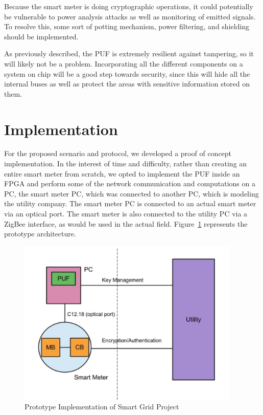 Because the smart meter is doing cryptographic operations, it could potentially be vulnerable to power analysis
attacks as well as monitoring of emitted signals. To resolve this, some sort of potting mechanism, power filtering,
and shielding should be implemented. 

As previously described, the PUF is extremely resilient against tampering, so it will likely not be a problem.
Incorporating all the different components on a system on chip will be a good step towards security, since this will
hide all the internal buses as well as protect the areas with sensitive information stored on them.

\section{Implementation}
For the proposed scenario and protocol, we developed a proof of concept implementation. In the interest of time and
difficulty, rather than creating an entire smart meter from scratch, we opted to implement the 
PUF inside an FPGA and perform some of the network communication and computations on a PC, the smart meter
PC, which was connected to another PC, which is modeling the utility company. The smart meter PC is connected
to an actual smart meter via an optical port. The smart meter is also connected to the utility PC via a ZigBee interface,
as would be used in the actual field. Figure~\ref{fig:doeimpl} represents the prototype architecture.

\begin{figure}[!ht]
\includegraphics[width=400px]{images/doe_impl.jpg}
\caption{Prototype Implementation of Smart Grid Project}
\label{fig:doeimpl}
\end{figure}
\FloatBarrier


